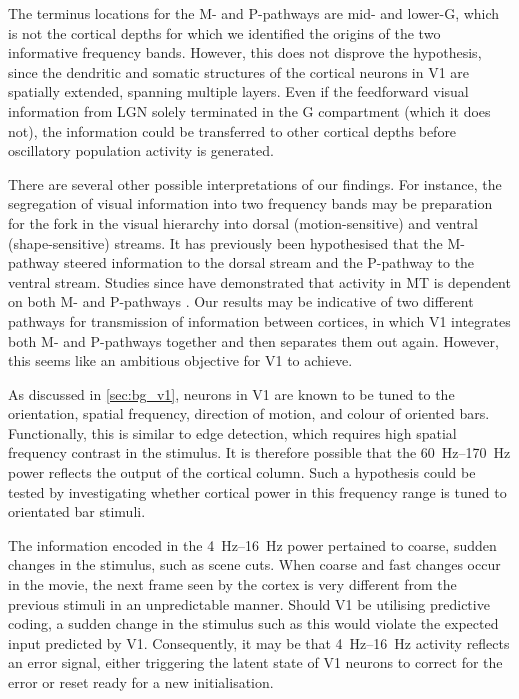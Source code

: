 The terminus locations for the M- and P-pathways are mid- and lower-\ac{G}, which is not the cortical depths for which we identified the origins of the two informative frequency bands.
However, this does not disprove the hypothesis, since the dendritic and somatic structures of the cortical neurons in \ac{V1} are spatially extended, spanning multiple layers.
Even if the feedforward visual information from \ac{LGN} solely terminated in the \ac{G} compartment (which it does not), the information could be transferred to other cortical depths before oscillatory population activity is generated.

There are several other possible interpretations of our findings.
For instance, the segregation of visual information into two frequency bands may be preparation for the fork in the visual hierarchy into dorsal (motion-sensitive) and ventral (shape-sensitive) streams.
It has previously been hypothesised that the M-pathway steered information to the dorsal stream and the P-pathway to the ventral stream.
Studies since have demonstrated that activity in \ac{MT} is dependent on both M- and P-pathways \citep{Merigan1991,Yabuta2001}.
Our results may be indicative of two different pathways for transmission of information between cortices, in which \ac{V1} integrates both M- and P-pathways together and then separates them out again.
However, this seems like an ambitious objective for \ac{V1} to achieve.

As discussed in \autoref{sec:bg_v1}, neurons in \ac{V1} are known to be tuned to the orientation, spatial frequency, direction of motion, and colour of oriented bars.
Functionally, this is similar to edge detection, which requires high spatial frequency contrast in the stimulus.
It is therefore possible that the \SIrange{60}{170}{Hz} power reflects the output of the cortical column.
Such a hypothesis could be tested by investigating whether cortical power in this frequency range is tuned to orientated bar stimuli.

The information encoded in the \SIrange{4}{16}{Hz} power pertained to coarse, sudden changes in the stimulus, such as scene cuts.
When coarse and fast changes occur in the movie, the next frame seen by the cortex is very different from the previous stimuli in an unpredictable manner.
Should \ac{V1} be utilising predictive coding, a sudden change in the stimulus such as this would violate the expected input predicted by \ac{V1}.
Consequently, it may be that \SIrange{4}{16}{Hz} activity reflects an error signal, either triggering the latent state of \ac{V1} neurons to correct for the error or reset ready for a new initialisation.

